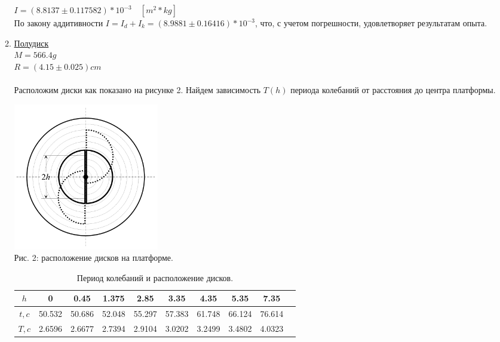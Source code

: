 \documentclass[12pt]{article}
\begin{document}
\begin{enumerate}
\begin{enumerate}
                    $I = (8.8137 \pm 0.117582) * 10^{-3} \quad [m^2 * kg]$ \\
                    По закону аддитивности $I = I_d + I_k = (8.9881 \pm 0.16416) * 10^{-3}$, что, с учетом погрешности, удовлетворяет результатам опыта.
                \item \underline{Полудиск} \\
                    $M = 566.4g$ \\ 
                    $R = (4.15 \pm 0.025)cm$ \\ \\
                    Расположим диски как показано на рисунке 2. Найдем зависимость $T(h)$ периода колебаний от расстояния до центра платформы.
                    \begin{center} 
                        \includegraphics[width=2.5in]{disk.png} \\ Рис. 2: расположение дисков на платформе.
                    \end{center}

                    \begin{table}[h]
                        \caption{Период колебаний и расположение дисков.}
                        \begin{center}
                        \begin{tabular}{|c|c|c|c|c|c|c|c|c|c|}
                            \hline 
                                $h$ & 0 & 0.45 & 1.375 & 2.85 & 3.35 & 4.35 & 5.35 & 7.35 \\
                            \hline
                                $t,c$ & 50.532 & 50.686 & 52.048 & 55.297 & 57.383& 61.748 & 66.124 & 76.614 \\
                            \hline
                                $T,c$ & 2.6596 & 2.6677 & 2.7394 & 2.9104 & 3.0202 & 3.2499 
                                & 3.4802 & 4.0323 \\
                            \hline
                        \end{tabular}
                        \end{center}
                    \end{table}



\end{enumerate}
\end{enumerate}
\end{document}
